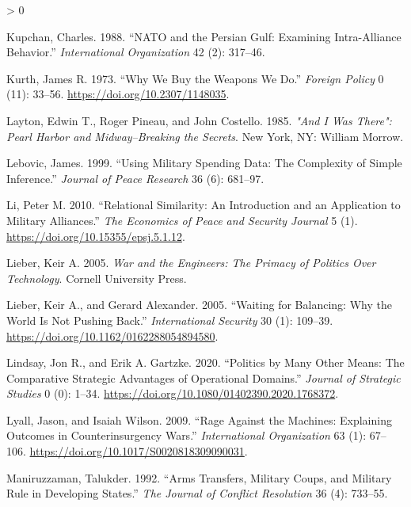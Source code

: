 \documentclass[
]{article}
\newlength{\cslhangindent}
\newenvironment{CSLReferences}[2] %
 {%
  \setlength{\parindent}{0pt}
  \ifodd #1 \everypar{\setlength{\hangindent}{\cslhangindent}}\ignorespaces\fi
  \ifnum #2 > 0
  \setlength{\parskip}{#2\baselineskip}
  \fi
 }%
 {}
\begin{document}
\begin{CSLReferences}{1}{0}
\leavevmode\hypertarget{ref-kupchan_natopersiangulf_1988}{}%
Kupchan, Charles. 1988. {``{NATO} and the {Persian Gulf}: {Examining Intra}-{Alliance Behavior}.''} \emph{International Organization} 42 (2): 317--46.

\leavevmode\hypertarget{ref-kurth_whywebuy_1973}{}%
Kurth, James R. 1973. {``Why {We Buy} the {Weapons We Do}.''} \emph{Foreign Policy} 0 (11): 33--56. \url{https://doi.org/10.2307/1148035}.

\leavevmode\hypertarget{ref-layton_wastherepearl_1985}{}%
Layton, Edwin T., Roger Pineau, and John Costello. 1985. \emph{"{And I} Was {There}": {Pearl Harbor} and {Midway}--Breaking the {Secrets}}. {New York, NY}: {William Morrow}.

\leavevmode\hypertarget{ref-lebovic_usingmilitaryspending_1999}{}%
Lebovic, James. 1999. {``Using {Military Spending Data}: {The Complexity} of {Simple Inference}.''} \emph{Journal of Peace Research} 36 (6): 681--97.

\leavevmode\hypertarget{ref-li_relationalsimilarityintroduction_2010}{}%
Li, Peter M. 2010. {``Relational Similarity: {An} Introduction and an Application to Military Alliances.''} \emph{The Economics of Peace and Security Journal} 5 (1). \url{https://doi.org/10.15355/epsj.5.1.12}.

\leavevmode\hypertarget{ref-lieber_warengineersprimacy_2005}{}%
Lieber, Keir A. 2005. \emph{War and the {Engineers}: {The Primacy} of {Politics Over Technology}}. {Cornell University Press}.

\leavevmode\hypertarget{ref-lieber_waitingbalancingwhy_2005}{}%
Lieber, Keir A., and Gerard Alexander. 2005. {``Waiting for {Balancing}: {Why} the {World Is Not Pushing Back}.''} \emph{International Security} 30 (1): 109--39. \url{https://doi.org/10.1162/0162288054894580}.

\leavevmode\hypertarget{ref-lindsay_politicsmanyother_2020}{}%
Lindsay, Jon R., and Erik A. Gartzke. 2020. {``Politics by Many Other Means: {The} Comparative Strategic Advantages of Operational Domains.''} \emph{Journal of Strategic Studies} 0 (0): 1--34. \url{https://doi.org/10.1080/01402390.2020.1768372}.

\leavevmode\hypertarget{ref-lyall_ragemachinesexplaining_2009}{}%
Lyall, Jason, and Isaiah Wilson. 2009. {``Rage {Against} the {Machines}: {Explaining Outcomes} in {Counterinsurgency Wars}.''} \emph{International Organization} 63 (1): 67--106. \url{https://doi.org/10.1017/S0020818309090031}.

\leavevmode\hypertarget{ref-maniruzzaman_armstransfersmilitary_1992}{}%
Maniruzzaman, Talukder. 1992. {``Arms {Transfers}, {Military Coups}, and {Military Rule} in {Developing States}.''} \emph{The Journal of Conflict Resolution} 36 (4): 733--55.


\end{CSLReferences}
\end{document}
